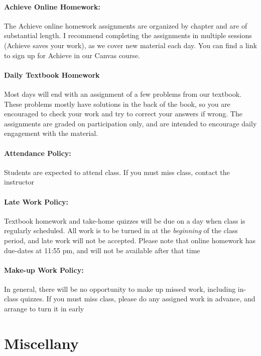 \documentclass[12pt, letterpaper]{article}
\begin{document}
\paragraph{Achieve Online Homework:}
The Achieve online homework assignments are organized by chapter and are of substantial length. I recommend completing the assignments in multiple sessions (Achieve saves your work), as we cover new material each day. You can find a link to sign up for Achieve in our Canvas course.

\paragraph{Daily Textbook Homework}
Most days will end with an assignment of a few problems from our textbook. These problems mostly have solutions in the back of the book, so you are encouraged to check your work and try to correct your answers if wrong. The assignments are graded on participation only, and are intended to encourage daily engagement with the material.

\paragraph{Attendance Policy:}
Students are expected to attend class. If you must miss class, contact the instructor

\paragraph{Late Work Policy:}
Textbook homework and take-home quizzes will be due on a day when class is regularly scheduled. All work is to be turned in at the \emph{beginning} of the class period, and late work will not be accepted. Please note that online homework has due-dates at 11:55 pm, and will not be available after that time

\paragraph{Make-up Work Policy:}
In general, there will be no opportunity to make up missed work, including in-class quizzes. If you must miss class, please do any assigned work in advance, and arrange to turn it in early

\section*{Miscellany}
\end{document}
